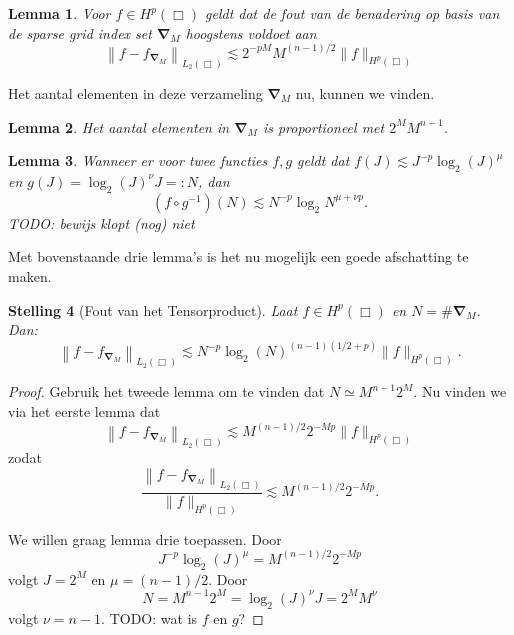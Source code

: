 \documentclass[11pt]{uvamath}
\theoremstyle{plain}
\newtheorem{stelling}{Stelling}[chapter]
\newtheorem{lemm}[stelling]{Lemma}
\theoremstyle{definition}
\theoremstyle{remark}
\begin{document}
\begin{lemm}{\cite[P3.2.3]{tammo}}
  Voor $f \in H^p(\Box)$ geldt dat de fout van de benadering op basis van de sparse grid index set $\boldsymbol{\nabla}_M$ hoogstens voldoet aan
  \[
  \left\| f - f_{\boldsymbol\nabla_M} \right\|_{L_2(\Box)} \lesssim 2^{-pM} M^{(n-1)/2} \| f \|_{H^p(\Box)}
  \]
\end{lemm}

Het aantal elementen in deze verzameling $\boldsymbol{\nabla}_M$ nu, kunnen we vinden.
\begin{lemm}{\cite[L3.3.1]{tammo}}
  Het aantal elementen in $\boldsymbol{\nabla}_M$ is proportioneel met $2^M M^{n-1}$.
\end{lemm}

\begin{lemm}
  Wanneer er voor twee functies $f, g$ geldt dat $f(J) \lesssim J^{-p}\log_2(J)^\mu$ en $g(J) = \log_2(J)^\nu J =: N$, dan
  \[
  (f \circ g^{-1})(N) \lesssim N^{-p} \log_2{N}^{\mu + \nu p}.
  \]
  TODO: bewijs klopt (nog) niet
\end{lemm}

Met bovenstaande drie lemma's is het nu mogelijk een goede afschatting te maken.
\begin{stelling}[Fout van het Tensorproduct]
  Laat $f \in H^p(\Box)$ en $N = \#\boldsymbol{\nabla}_M$. Dan:
  \[
  \left\| f - f_{\boldsymbol\nabla_M} \right\|_{L_2(\Box)} \lesssim N^{-p} \log_2(N)^{(n-1)(1/2 + p)} \| f \|_{H^p(\Box)}.
  \]
\end{stelling}
\begin{proof}
  Gebruik het tweede lemma om te vinden dat $N \simeq M^{n-1}2^M$. Nu vinden we via het eerste lemma dat
  \[
  \left\| f - f_{\boldsymbol\nabla_M} \right\|_{L_2(\Box)} \lesssim M^{(n-1)/2}2^{-Mp}\| f \|_{H^p(\Box)}
  \]
  zodat
  \[
  \frac{\left\| f - f_{\boldsymbol\nabla_M}  \right\|_{L_2(\Box)}}{\| f \|_{H^p(\Box)}} \lesssim M^{(n-1)/2}2^{-Mp}.
  \]

  We willen graag lemma drie toepassen. Door
  \[
  J^{-p}\log_2(J)^\mu = M^{(n-1)/2} 2^{-Mp}
  \]
  volgt $J = 2^M$ en $\mu = (n-1)/2$. Door
  \[
  N = M^{n-1}2^M = \log_2(J)^\nu J = 2^M M^\nu
  \] volgt $\nu = n-1$. TODO: wat is $f$ en $g$?
\end{proof}
\end{document}
